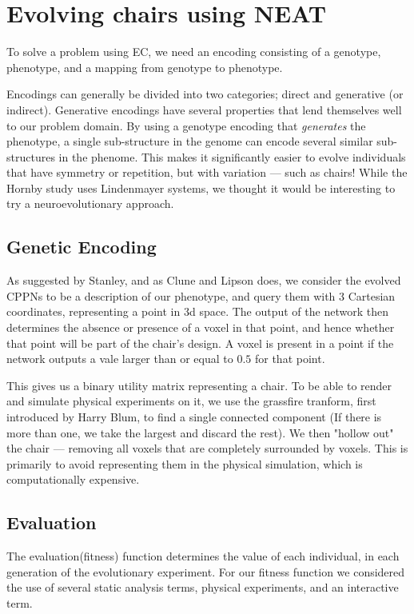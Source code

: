 \section{Evolving chairs using NEAT}
To solve a problem using EC, we need an encoding consisting of a genotype,
phenotype, and a mapping from genotype to phenotype.

Encodings can generally be divided into two categories; direct and generative
(or indirect). Generative encodings have several properties that lend themselves
well to our problem domain. By using a genotype encoding that \emph{generates}
the phenotype, a single sub-structure in the genome can encode several similar
sub-structures in the phenome. This makes it significantly easier to evolve
individuals that have symmetry or repetition, but with variation --- such as
chairs! While the Hornby study\cite{paper:ev4} uses Lindenmayer
systems\cite{Hornby2003}, we thought it would be interesting to try a
neuroevolutionary approach.

\subsection{Genetic Encoding}
As suggested by Stanley\cite{Stanley2007}, and as Clune and
Lipson\cite{Clune:2011:EOG:2078245.2078246} does, we consider the evolved CPPNs
to be a description of our phenotype, and query them with 3 Cartesian
coordinates, representing a point in 3d space. The output of the network then
determines the absence or presence of a voxel in that point, and hence whether
that point will be part of the chair's design. A voxel is present in a point if
the network outputs a vale larger than or equal to $0.5$ for that point.

This gives us a binary utility matrix representing a chair. To be able to render
and simulate physical experiments on it, we use the grassfire tranform, first
introduced by Harry Blum\cite{blum67}, to find a single connected component (If
there is more than one, we take the largest and discard the rest). We then
"hollow out" the chair --- removing all voxels that are completely surrounded by
voxels. This is primarily to avoid representing them in the physical simulation,
which is computationally expensive.

\subsection{Evaluation}
\label{sec:evaluation}
The evaluation(fitness) function determines the value of each individual, in
each generation of the evolutionary experiment. For our fitness function we
considered the use of several static analysis terms, physical experiments, and
an interactive term.

